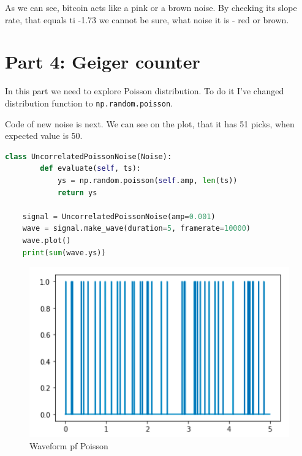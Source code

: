\documentclass[a4paper]{article}
\begin{document}
        As we can see, bitcoin acts like a pink or a brown noise. By checking its slope rate, that equals ti -1.73 we cannot be sure, what noise it is - red or brown.
            
    \newpage
        \section{Part 4: Geiger counter}
        
            In this part we need to explore Poisson distribution. To do it I've changed distribution function to \texttt{np.random.poisson}.
            
            Code of new noise is next. We can see on the plot, that it has 51 picks, when expected value is 50.
            
            \begin{lstlisting}[language=Python,caption=Usage of Poisson,label={lst:part4}]
    class UncorrelatedPoissonNoise(Noise):
        def evaluate(self, ts):
            ys = np.random.poisson(self.amp, len(ts))
            return ys
            
    signal = UncorrelatedPoissonNoise(amp=0.001)
    wave = signal.make_wave(duration=5, framerate=10000)
    wave.plot()
    print(sum(wave.ys))
            \end{lstlisting}
            
            \begin{figure}[H]
                \centering
                \includegraphics[width=\textwidth]{img/geiger.png}
                \caption{Waveform pf Poisson}
                \label{fig:part42}
            \end{figure}
            
\end{document}
